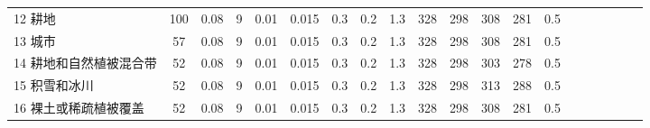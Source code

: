 \begin{landscape}
\begin{table}[htbp]
\begin{tabular}{@{}lccccccccccccccccccc@{}}
        12 耕地         & 100 & 0.08 & 9 & 0.01 & 0.015 & 0.3 & 0.2 & 1.3 & 328 & 298 & 308 & 281 & 0.5 \\
        13 城市         & 57  & 0.08 & 9 & 0.01 & 0.015 & 0.3 & 0.2 & 1.3 & 328 & 298 & 308 & 281 & 0.5 \\
        14 耕地和自然植被混合带 & 52  & 0.08 & 9 & 0.01 & 0.015 & 0.3 & 0.2 & 1.3 & 328 & 298 & 303 & 278 & 0.5 \\
        15 积雪和冰川      & 52  & 0.08 & 9 & 0.01 & 0.015 & 0.3 & 0.2 & 1.3 & 328 & 298 & 313 & 288 & 0.5 \\
        16 裸土或稀疏植被覆盖  & 52  & 0.08 & 9 & 0.01 & 0.015 & 0.3 & 0.2 & 1.3 & 328 & 298 & 308 & 281 & 0.5 \\\bottomrule
        \end{tabular}
\end{table}
\end{landscape}


